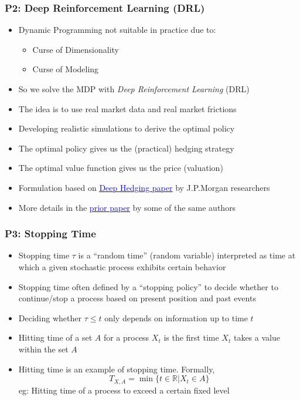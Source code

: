 \documentclass[handout]{beamer}
\begin{document}
\begin{frame}
\frametitle{P2: Deep Reinforcement Learning (DRL)}
\pause
\begin{itemize}[<+->]
\item Dynamic Programming not suitable in practice due to:
\begin{itemize}
\item Curse of Dimensionality
\item Curse of Modeling
\end{itemize}
\item So we solve the MDP with {\em Deep Reinforcement Learning} (DRL)
\item The idea is to use real market data and real market frictions
\item Developing realistic simulations to derive the optimal policy
\item The optimal policy gives us the (practical) hedging strategy
\item The optimal value function gives us the price (valuation)
\item Formulation based on \href{https://papers.ssrn.com/sol3/papers.cfm?abstract_id=3355706}{\underline{\textcolor{blue}{Deep Hedging paper}}} by J.P.Morgan researchers
\item More details in the \href{https://papers.ssrn.com/sol3/papers.cfm?abstract_id=3355706}{\underline{\textcolor{blue}{prior paper}}} by some of the same authors
\end{itemize}
\end{frame}


\begin{frame}
\frametitle{P3: Stopping Time}
\pause
\begin{itemize}[<+->]
\item Stopping time $\tau$ is a ``random time'' (random variable) interpreted as time at which a given stochastic process exhibits certain behavior
\item Stopping time often defined by a ``stopping policy'' to decide whether to continue/stop a process based on present position and past events
\item Deciding whether $\tau \leq t$ only depends on information up to time $t$
\item Hitting time of a set $A$ for a process $X_t$ is the first time $X_t$ takes a value within the set $A$
\item Hitting time is an example of stopping time. Formally, 
$$T_{X,A} = \min \{t \in \mathbb{R} | X_t \in A\}$$
eg: Hitting time of a process to exceed a certain fixed level
\end{itemize}
\end{frame}
\end{document}
